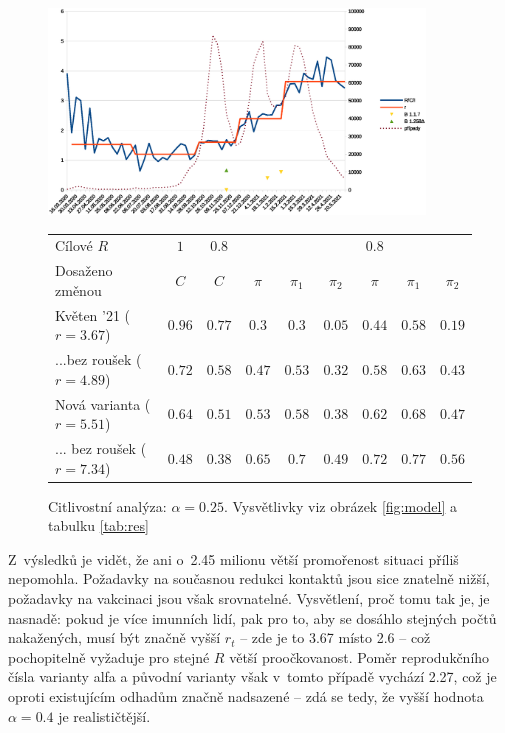 \begin{figure}
\begin{center}
\includegraphics[width=10cm]{pic/whole4}
						 

\begin{tabular}{l|c|c|ccc|ccc}									
Cílové $R$	& $1$	& $0.8$	&	&	&	& $0.8$	&	&	\\ 
Dosaženo změnou	& $C$	& $C$	& $\pi$	& $\pi_1$	& $\pi_2$	& $\pi$	& $\pi_1$	& $\pi_2$	\\ \hline
Květen '21 ($r=3.67$)	& $0.96$	& $0.77$	& $0.3$	& $0.3$	& $0.05$	& $0.44$	& $0.58$	& $0.19$	\\
...bez roušek ($r=4.89$)	& $0.72$	& $0.58$	& $0.47$	& $0.53$	& $0.32$	& $0.58$	& $0.63$	& $0.43$	\\
Nová varianta ($r=5.51$)	& $0.64$	& $0.51$	& $0.53$	& $0.58$	& $0.38$	& $0.62$	& $0.68$	& $0.47$	\\
... bez roušek ($r=7.34$)	& $0.48$	& $0.38$	& $0.65$	& $0.7$	& $0.49$	& $0.72$	& $0.77$	& $0.56$	
\end{tabular}									


\caption{Citlivostní analýza: $\alpha=0.25$. Vysvětlivky viz obrázek \ref{fig:model} a tabulku \ref{tab:res}}
\label{fig:calpha}
\end{center}
\end{figure}
Z~výsledků je vidět, že ani o~2.45 milionu větší promořenost situaci příliš
nepomohla. Požadavky na současnou redukci kontaktů jsou sice znatelně
nižší, požadavky na vakcinaci jsou však srovnatelné. Vysvětlení, proč
tomu tak je, je nasnadě: pokud je více imunních lidí, pak pro to,
aby se dosáhlo stejných počtů nakažených, musí být značně vyšší $r_{t}$
-- zde je to 3.67 místo 2.6 -- což pochopitelně vyžaduje pro stejné $R$
větší proočkovanost. Poměr reprodukčního čísla varianty alfa a
původní varianty však v~tomto případě vychází 2.27, což je oproti
existujícím odhadům značně nadsazené -- zdá se tedy, že vyšší hodnota
$\alpha=0.4$ je realističtější.

